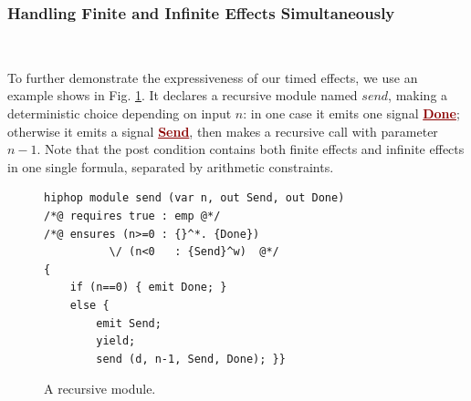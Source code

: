 \documentclass[acmsmall,review,anonymous]{acmart}\settopmatter{printfolios=true,printccs=false,printacmref=false}
\newcommand{\anyevent}[1]{{\textcolor{darkred}
{\underline{\textbf{\footnotesize #1}}}}}
\newcommand{\code}[1]{{\tt{\ensuremath{\m{#1}}}}}
\newcommand{\m}{\mathit}
\newcommand\figref[1]{Fig. \textcolor{black}{\ref{#1}}.}
\begin{document}
\subsubsection{Handling Finite and Infinite Effects Simultaneously}~\\
\label{rec:finit_infinite}

      \vspace{-2mm}
To further demonstrate the expressiveness of our timed effects, we use an example shows in \figref{fig:case_study_finit_infinit}
It declares a recursive module named \code{send}, making a deterministic choice depending on input \code{n}: in one case it emits one  signal  \anyevent{Done}; otherwise it emits a signal 
\anyevent{Send}, then makes a recursive call with parameter \code{n{-}1}.  Note that the post condition contains both finite effects and infinite effects in one single formula, separated by arithmetic constraints. 




\begin{figure}
      \vspace{-2mm}
\begin{lstlisting}[columns=fullflexible]
hiphop module send (var n, out Send, out Done)
/*@ requires true : emp @*/
/*@ ensures	(n>=0 : {}^*. {Done}) 
          \/ (n<0   : {Send}^w)  @*/
{
	if (n==0) { emit Done; }
	else {
		emit Send;
		yield;
		send (d, n-1, Send, Done); }}
\end{lstlisting}  
      \vspace{-1mm}
      \caption{A recursive  module.}\label{fig:case_study_finit_infinit}
         \vspace{-2mm}
\end{figure}
\end{document}
